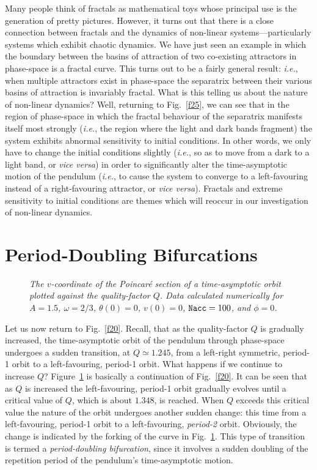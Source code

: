Many people think of fractals as mathematical toys whose principal use is the generation
of pretty pictures. However, it turns out that there is a close connection between fractals
and the dynamics of non-linear systems---particularly systems which exhibit chaotic
dynamics. We have just seen an example in which the boundary between the basins of attraction of two
co-existing attractors in phase-space is a fractal curve. This turns out to be a fairly
general result: {\em i.e.}, when multiple attractors exist in phase-space the separatrix
between their various basins of attraction is invariably fractal. What is this telling us
about the nature of non-linear dynamics? Well, returning to Fig.~\ref{f25}, we can see that in the
region of phase-space in which the fractal behaviour of the separatrix manifests itself most
strongly ({\em i.e.}, the region where the light and dark bands fragment) the system exhibits
abnormal sensitivity to  initial conditions. In other words, we only have to change the initial
conditions slightly ({\em i.e.}, so as to move from a dark to a light band, or {\em vice versa})
in order to significantly alter the time-asymptotic motion of the pendulum ({\em i.e.}, to cause the
system to converge to a left-favouring  instead of  a right-favouring attractor, 
or {\em vice versa}). Fractals and extreme sensitivity to initial conditions
are themes which will reoccur in our investigation of non-linear dynamics.

\section{Period-Doubling Bifurcations}
\begin{figure}
\epsfysize=3in
\centerline{}
\caption{\em The $v$-coordinate of the Poincar\'{e} section of a time-asymptotic orbit
plotted against the quality-factor $Q$. Data
 calculated numerically for
$A=1.5$, $\omega=2/3$, $\theta(0)=0$, $v(0)=0$, ${\tt Nacc} =100$, and $\phi=0$. }\label{f29}
\end{figure}
Let us now return to Fig.~\ref{f20}. Recall, that as the quality-factor $Q$
is gradually increased,  the time-asymptotic orbit of the
pendulum through phase-space undergoes a sudden transition, at $Q\simeq 1.245$, from a
left-right symmetric, period-1  orbit to a left-favouring, period-1 orbit. What happens if
we continue to increase $Q$? Figure~\ref{f29} is basically a continuation of Fig.~\ref{f20}. 
It can be seen that as $Q$ is increased the left-favouring, period-1 orbit gradually
evolves until a critical value of $Q$, which is about $1.348$, is reached.
When $Q$ exceeds this critical value the nature of the orbit undergoes another sudden change:
this time
from a left-favouring, period-1 orbit to a left-favouring, {\em period-2} orbit. 
Obviously, the
change is
indicated by the forking of the curve in Fig.~\ref{f29}. This type of transition
is termed a {\em period-doubling bifurcation}, since it involves a 
sudden doubling of the
repetition period of the pendulum's time-asymptotic motion. 

